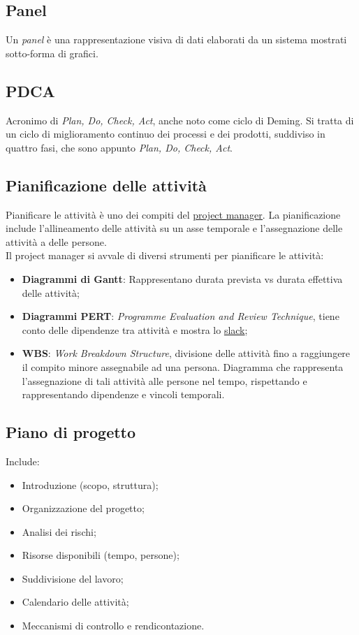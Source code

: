 	\newpage


	\subsection{Panel}
	\label{sec:panel}
	Un \emph{panel} è una rappresentazione visiva di dati elaborati da un sistema mostrati sotto-forma di grafici.


	\subsection{PDCA}
	\label{sec:pdca}
	Acronimo di \emph{Plan, Do, Check, Act}, anche noto come ciclo di Deming. Si tratta di un ciclo di miglioramento continuo dei processi e dei prodotti, suddiviso in quattro fasi, che sono appunto \emph{Plan, Do, Check, Act}.


	\subsection{Pianificazione delle attività}
	\label{sec:pianificazioneattivita}
	Pianificare le attività è uno dei compiti del \underline{\hyperref[sec:projectmanager]{project manager}}.
	La pianificazione include l'allineamento delle attività su un asse temporale e l'assegnazione delle attività a delle persone. \\Il project manager si avvale di diversi strumenti per pianificare le attività:
	\begin{itemize}
	\item \textbf{Diagrammi di Gantt}: Rappresentano durata prevista vs durata effettiva delle attività;
	\item \textbf{Diagrammi PERT}: \emph{Programme Evaluation and Review Technique}, tiene conto delle dipendenze tra attività e mostra lo \hyperref[sec:slack]{slack};
	\item \textbf{WBS}: \emph{Work Breakdown Structure}, divisione delle attività fino a raggiungere il compito minore assegnabile ad una persona. Diagramma che rappresenta l'assegnazione di tali attività alle persone nel tempo, rispettando e rappresentando dipendenze e vincoli temporali.
	\end{itemize}

	\subsection{Piano di progetto}
	\label{sec:pianoprogetto}
	Include:
	\begin{itemize}
		\item Introduzione (scopo, struttura);
		\item Organizzazione del progetto;
		\item Analisi dei rischi;
		\item Risorse disponibili (tempo, persone);
		\item Suddivisione del lavoro;
		\item Calendario delle attività;
		\item Meccanismi di controllo e rendicontazione.
	\end{itemize}

